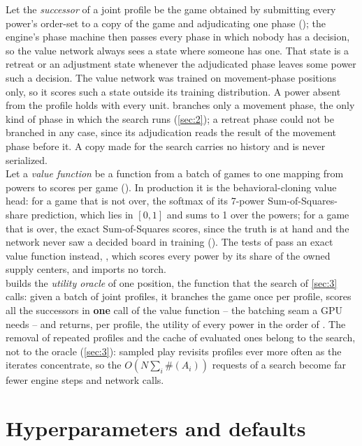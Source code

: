 \documentclass[12pt,a4paper]{article}
\begin{document}
Let the \emph{successor} of a joint profile be the game obtained by submitting every power's order-set to a copy of the game and adjudicating one phase (); the engine's phase machine then passes every phase in which nobody has a decision, so the value network always sees a state where someone has one.
That state is a retreat or an adjustment state whenever the adjudicated phase leaves some power such a decision.
The value network was trained on movement-phase positions only, so it scores such a state outside its training distribution.
A power absent from the profile holds with every unit.
 branches only a movement phase, the only kind of phase in which the search runs (\cref{sec:2}); a retreat phase could not be branched in any case, since its adjudication reads the result of the movement phase before it.
A copy made for the search carries no history and is never serialized.\\
Let a \emph{value function} be a function from a batch of games to one mapping from powers to scores per game ().
In production it is the behavioral-cloning value head: for a game that is not over, the softmax of its 7-power Sum-of-Squares-share prediction, which lies in $[0, 1]$ and sums to 1 over the powers; for a game that is over, the exact Sum-of-Squares scores, since the truth is at hand and the network never saw a decided board in training ().
The tests of  pass an exact value function instead, , which scores every power by its share of the owned supply centers, and  imports no torch.\\
 builds the \emph{utility oracle} of one position, the function  that the search of \cref{sec:3} calls: given a batch of joint profiles, it branches the game once per profile, scores all the successors in \textbf{one} call of the value function -- the batching seam a GPU needs -- and returns, per profile, the utility of every power in the order of .
The removal of repeated profiles and the cache of evaluated ones belong to the search, not to the oracle (\cref{sec:3}): sampled play revisits profiles ever more often as the iterates concentrate, so the $O(N \sum_i \#(A_i))$ requests of a search become far fewer engine steps and network calls.

\section{Hyperparameters and defaults}\label{sec:7}
\end{document}
